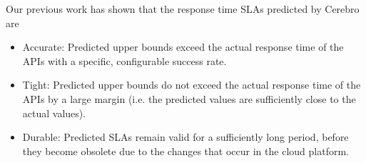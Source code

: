 Our previous work has shown that the response time SLAs predicted by Cerebro are
\begin{itemize}
\item Accurate: Predicted upper bounds exceed the actual response time of the APIs
with a specific, configurable success rate.
\item Tight: Predicted upper bounds do not exceed the actual response time of the APIs by
a large margin (i.e. the predicted values are sufficiently close to the actual values).
\item Durable: Predicted SLAs remain valid for a sufficiently long period, before they
become obsolete due to the changes that occur in the cloud platform.
\end{itemize}